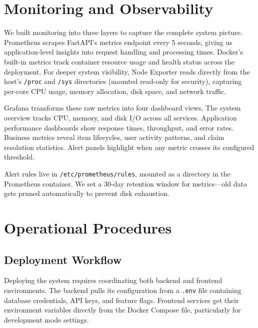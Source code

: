 
\section{Monitoring and Observability} \label{section:monitoring_observability}

We built monitoring into three layers to capture the complete system picture. Prometheus scrapes FastAPI's metrics endpoint every 5 seconds, giving us application-level insights into request handling and processing times. Docker's built-in metrics track container resource usage and health status across the deployment. For deeper system visibility, Node Exporter reads directly from the host's \texttt{/proc} and \texttt{/sys} directories (mounted read-only for security), capturing per-core CPU usage, memory allocation, disk space, and network traffic.

Grafana transforms these raw metrics into four dashboard views. The system overview tracks CPU, memory, and disk I/O across all services. Application performance dashboards show response times, throughput, and error rates. Business metrics reveal item lifecycles, user activity patterns, and claim resolution statistics. Alert panels highlight when any metric crosses its configured threshold.

Alert rules live in \texttt{/etc/prometheus/rules}, mounted as a directory in the Prometheus container. We set a 30-day retention window for metrics—old data gets pruned automatically to prevent disk exhaustion.


\section{Operational Procedures} \label{section:operational_procedures}

\subsection{Deployment Workflow} \label{subsection:deployment_workflow}

Deploying the system requires coordinating both backend and frontend environments. The backend pulls its configuration from a \texttt{.env} file containing database credentials, API keys, and feature flags. Frontend services get their environment variables directly from the Docker Compose file, particularly for development mode settings.

